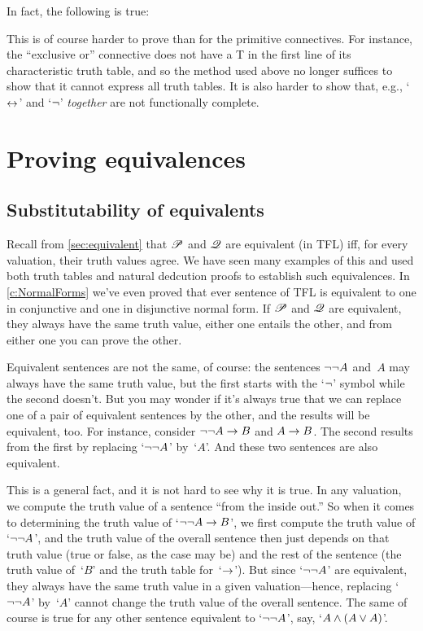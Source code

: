 In fact, the following is true:
        

This is of course harder to prove than for the primitive connectives. For instance, the ``exclusive or'' connective does not have a T in the first line of its characteristic truth table, and so the method used above no longer suffices to show that it cannot express all truth tables.  It is also harder to show that, e.g., `$\leftrightarrow$' and `$\neg$' \emph{together} are not functionally complete.

\chapter{Proving equivalences}\label{ch:equivalences}

\section{Substitutability of equivalents}

Recall from \cref{sec:equivalent} that $\mathscr{P}$ and $\mathscr{Q}$ are equivalent (in TFL) iff, for every valuation, their truth values agree.  We have seen many examples of this and used both truth tables and natural dedcution proofs to establish such equivalences.  In \cref{c:NormalForms} we've even proved that ever sentence of TFL is equivalent to one in conjunctive and one in disjunctive normal form.  If $\mathscr{P}$ and $\mathscr{Q}$ are equivalent, they always have the same truth value, either one entails the other, and from either one you can prove the other.

Equivalent sentences are not the same, of course: the sentences $\neg\neg A$ and~$A$ may always have the same truth value, but the first starts with the `$\neg$' symbol while the second doesn't.  But you may wonder if it's always true that we can replace one of a pair of equivalent sentences by the other, and the results will be equivalent, too.  For instance, consider $\neg\neg A \rightarrow B$ and $A \rightarrow B$.  The second results from the first by replacing `$\neg\neg A$' by~`$A$'.  And these two sentences are also equivalent.

This is a general fact, and it is not hard to see why it is true.  In any valuation, we compute the truth value of a sentence ``from the inside out.'' So when it comes to determining the truth value of `$\neg\neg A \rightarrow B$', we first compute the truth value of `$\neg\neg A$', and the truth value of the overall sentence then just depends on that truth value (true or false, as the case may be) and the rest of the sentence (the truth value of~`$B$' and the truth table for~`$\rightarrow$'). But since `$\neg\neg A$' are equivalent, they always have the same truth value in a given valuation---hence, replacing `$\neg\neg A$' by~`$A$' cannot change the truth value of the overall sentence.  The same of course is true for any other sentence equivalent to `$\neg\neg A$', say, `$A \wedge (A \vee A)$'.

